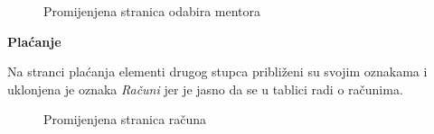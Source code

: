 \documentclass[times, utf8, zavrsni, numeric]{fer}
\begin{document}
        \begin{figure} [H]
          \centering
          \caption{Promijenjena stranica odabira mentora}
        \end{figure}
        
        \noindent\textbf{Plaćanje}
        
        Na stranci plaćanja elementi drugog stupca približeni su svojim oznakama i uklonjena je oznaka \textit{Računi} jer je jasno da se u tablici radi o računima.
        
        \begin{figure} [H]
          \centering
          \caption{Promijenjena stranica računa}
        \end{figure}
        
\end{document}
